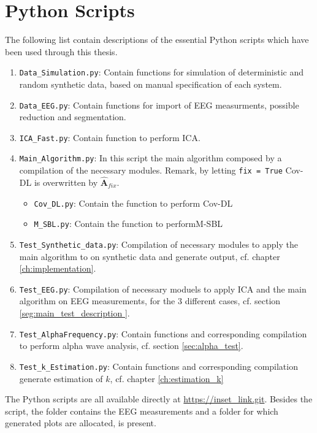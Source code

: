 \chapter{Python Scripts}\label{App:code}
The following list contain descriptions of the essential Python scripts which have been used through this thesis. 
\begin{enumerate}
\item \texttt{Data\_Simulation.py}: Contain functions for simulation of deterministic and random synthetic data, based on manual specification of each system.  
\item \texttt{Data\_EEG.py}: Contain functions for import of EEG measurments, possible reduction and segmentation.  
\item \texttt{ICA\_Fast.py}: Contain function to perform ICA.
\item \texttt{Main\_Algorithm.py}: In this script the main algorithm composed by a compilation of the necessary modules. Remark, by letting \texttt{fix = True} Cov-DL is overwritten by $\hat{\textbf{A}}_{fix}$. 
\begin{itemize}
\item \texttt{Cov\_DL.py}: Contain the function to perform Cov-DL 
\item \texttt{M\_SBL.py}: Contain the function to performM-SBL
\end{itemize} 
\item \texttt{Test\_Synthetic\_data.py}: Compilation of necessary modules to apply the main algorithm to on synthetic data and generate output, cf. chapter \ref{ch:implementation}.
\item \texttt{Test\_EEG.py}: Compilation of necessary moduels to apply ICA and the main algorithm on EEG measurements, for the 3 different cases, cf. section \ref{seg:main_test_description }.  
\item \texttt{Test\_AlphaFrequency.py}: Contain functions and corresponding compilation to perform  alpha wave analysis, cf. section \ref{sec:alpha_test}.
\item \texttt{Test\_k\_Estimation.py}: Contain functions and corresponding compilation generate  estimation of $k$, cf. chapter \ref{ch:estimation_k} 
\end{enumerate}
The Python scripts are all available directly at \url{https://inset_link.git}. Besides the script, the folder contains the EEG measurements and a folder for which generated plots are allocated, is present.  


	                                                                                                                                                                                                                                                                 
